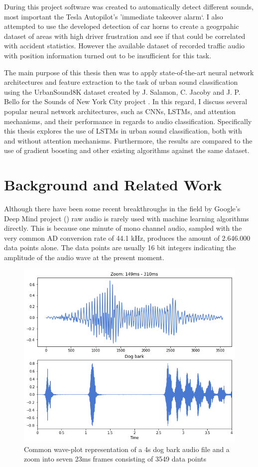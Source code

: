During this project software was created to automatically detect different sounds, most important the Tesla Autopilot's 'immediate takeover alarm`. I also attempted to use the developed detection of car horns to create a geogrpahic dataset of areas with high driver frustration and see if that could be correlated with accident statistics. However the available dataset of recorded traffic audio with position information turned out to be insufficient for this task.

The main purpose of this thesis then was to apply state-of-the-art neural network architectures and feature extraction to the task of urban sound classification using the UrbanSound8K dataset created by J. Salamon, C. Jacoby and J. P. Bello for the Sounds of New York City project \cite{Salamon:UrbanSound:ACMMM:14}. In this regard, I discuss several popular neural network architectures, such as CNNs, LSTMs, and attention mechanisms, and their performance in regards to audio classification. Specifically this thesis explores the use of LSTMs in urban sound classification, both with and without attention mechanisms. Furthermore, the results are compared to the use of gradient boosting and other existing algorithms against the same dataset.




\chapter{Background and Related Work}
\label{Background and Related Work}

Although there have been some recent breakthroughs in the field by Google's Deep Mind project (\cite{DBLP:journals/corr/OordDZSVGKSK16}) raw audio is rarely used  with machine learning algorithms directly. This is because one minute of mono channel audio, sampled with the very common AD conversion rate of 44.1 kHz, produces the amount of 2.646.000 data points alone. The data points are usually 16 bit integers indicating the amplitude of the audio wave at the present moment.


\begin{figure}[h]
    \centering
	\includegraphics[width=.7\textwidth]{./images/illustrations/audio-signal}
    \caption{Common wave-plot representation of a 4s dog bark audio file and a zoom into seven 23ms frames consisting of 3549 data points}
    \label{fig:audio}
\end{figure}


